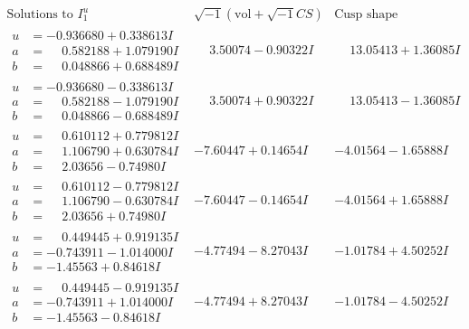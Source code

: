 \documentclass[1p]{elsarticle_modified}
\theoremstyle{definition}
\newcommand{\I}{\sqrt{-1}}
\begin{document}
$$\begin{array}{c|c|c}  
\text{Solutions to }I^u_{1}& \I (\text{vol} + \sqrt{-1}CS) & \text{Cusp shape}\\
 \hline 
\begin{aligned}
u &= -0.936680 + 0.338613 I \\
a &= \phantom{-}0.582188 + 1.079190 I \\
b &= \phantom{-}0.048866 + 0.688489 I\end{aligned}
 & \phantom{-}3.50074 - 0.90322 I & \phantom{-}13.05413 + 1.36085 I \\ \hline\begin{aligned}
u &= -0.936680 - 0.338613 I \\
a &= \phantom{-}0.582188 - 1.079190 I \\
b &= \phantom{-}0.048866 - 0.688489 I\end{aligned}
 & \phantom{-}3.50074 + 0.90322 I & \phantom{-}13.05413 - 1.36085 I \\ \hline\begin{aligned}
u &= \phantom{-}0.610112 + 0.779812 I \\
a &= \phantom{-}1.106790 + 0.630784 I \\
b &= \phantom{-}2.03656 - 0.74980 I\end{aligned}
 & -7.60447 + 0.14654 I & -4.01564 - 1.65888 I \\ \hline\begin{aligned}
u &= \phantom{-}0.610112 - 0.779812 I \\
a &= \phantom{-}1.106790 - 0.630784 I \\
b &= \phantom{-}2.03656 + 0.74980 I\end{aligned}
 & -7.60447 - 0.14654 I & -4.01564 + 1.65888 I \\ \hline\begin{aligned}
u &= \phantom{-}0.449445 + 0.919135 I \\
a &= -0.743911 - 1.014000 I \\
b &= -1.45563 + 0.84618 I\end{aligned}
 & -4.77494 - 8.27043 I & -1.01784 + 4.50252 I \\ \hline\begin{aligned}
u &= \phantom{-}0.449445 - 0.919135 I \\
a &= -0.743911 + 1.014000 I \\
b &= -1.45563 - 0.84618 I\end{aligned}
 & -4.77494 + 8.27043 I & -1.01784 - 4.50252 I \\ \hline\begin{aligned}

\end{aligned}
\end{array}$$
\end{document}
